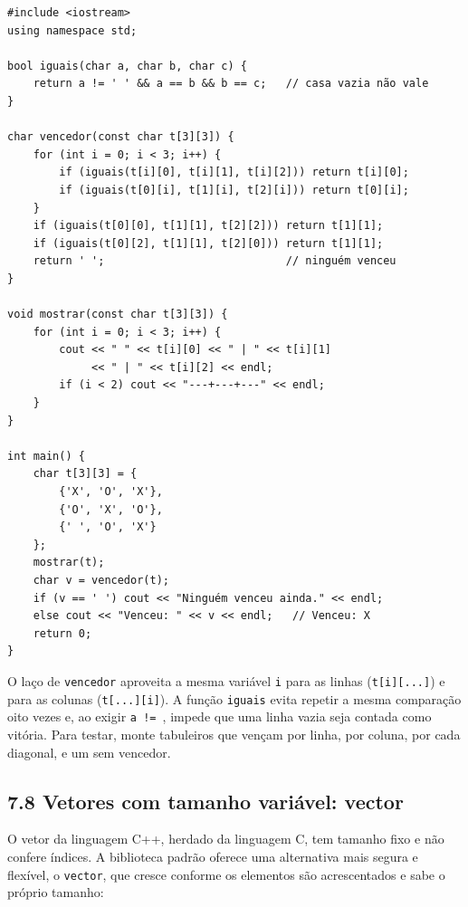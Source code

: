 \begin{codigo}
\begin{Verbatim}[breaklines=true, breaksymbolleft={}, fontsize=\footnotesize]
#include <iostream>
using namespace std;

bool iguais(char a, char b, char c) {
    return a != ' ' && a == b && b == c;   // casa vazia não vale
}

char vencedor(const char t[3][3]) {
    for (int i = 0; i < 3; i++) {
        if (iguais(t[i][0], t[i][1], t[i][2])) return t[i][0];
        if (iguais(t[0][i], t[1][i], t[2][i])) return t[0][i];
    }
    if (iguais(t[0][0], t[1][1], t[2][2])) return t[1][1];
    if (iguais(t[0][2], t[1][1], t[2][0])) return t[1][1];
    return ' ';                            // ninguém venceu
}

void mostrar(const char t[3][3]) {
    for (int i = 0; i < 3; i++) {
        cout << " " << t[i][0] << " | " << t[i][1]
             << " | " << t[i][2] << endl;
        if (i < 2) cout << "---+---+---" << endl;
    }
}

int main() {
    char t[3][3] = {
        {'X', 'O', 'X'},
        {'O', 'X', 'O'},
        {' ', 'O', 'X'}
    };
    mostrar(t);
    char v = vencedor(t);
    if (v == ' ') cout << "Ninguém venceu ainda." << endl;
    else cout << "Venceu: " << v << endl;   // Venceu: X
    return 0;
}
\end{Verbatim}
\end{codigo}

O laço de \texttt{vencedor} aproveita a mesma variável \texttt{i} para as linhas (\texttt{t[i][...]}) e para as colunas (\texttt{t[...][i]}). A função \texttt{iguais} evita repetir a mesma comparação oito vezes e, ao exigir \texttt{a != \textquotesingle{} \textquotesingle{}}, impede que uma linha vazia seja contada como vitória. Para testar, monte tabuleiros que vençam por linha, por coluna, por cada diagonal, e um sem vencedor.

\subsection{7.8 Vetores com tamanho variável: vector}

O vetor da linguagem C++, herdado da linguagem C, tem tamanho fixo e não confere índices. A biblioteca padrão oferece uma alternativa mais segura e flexível, o \texttt{vector}, que cresce conforme os elementos são acrescentados e sabe o próprio tamanho:

